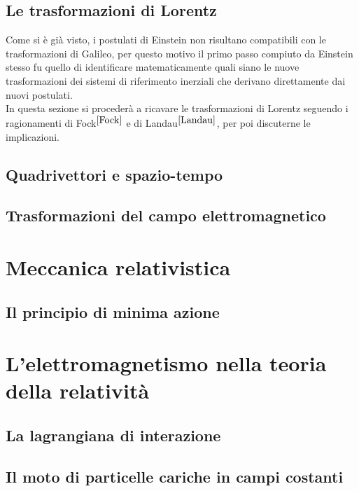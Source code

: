 \documentclass[12pt,a4paper]{book}
\numberwithin{equation}{section}
\begin{document}
\begin{sloppypar}
\section{Le trasformazioni di Lorentz}
Come si è già visto, i postulati di Einstein non risultano compatibili con le trasformazioni di Galileo, 
per questo motivo il primo passo compiuto da Einstein stesso fu quello di identificare matematicamente quali siano 
le nuove trasformazioni dei sistemi di riferimento inerziali che derivano direttamente dai nuovi postulati.\\
In questa sezione si procederà a ricavare le trasformazioni di Lorentz seguendo i ragionamenti di Fock$^{\cite{Fock}}$ e di Landau$ ^{\cite{Landau}}$, 
per poi discuterne le implicazioni.  




\section{Quadrivettori e spazio-tempo}
\label{sec:4-vettori}


\section{Trasformazioni del campo elettromagnetico}


\chapter{Meccanica relativistica}
\section{Il principio di minima azione}


%


\chapter{L'elettromagnetismo nella teoria della relatività}
\section{La lagrangiana di interazione}

\section{Il moto di particelle cariche in campi costanti}




\appendix





\end{sloppypar}
\end{document}
